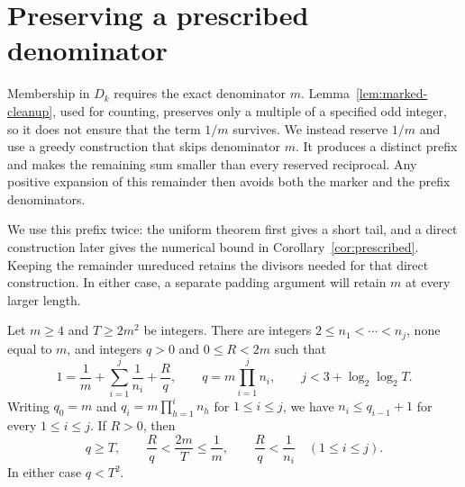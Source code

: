 \section{Preserving a prescribed denominator}\label{sec:prescribed}

Membership in $D_k$ requires the exact denominator $m$.
Lemma~\ref{lem:marked-cleanup}, used for counting, preserves only a
multiple of a specified odd integer, so it does not ensure that the
term $1/m$ survives. We instead reserve $1/m$ and use a greedy
construction that skips denominator $m$. It produces a distinct prefix
and makes the remaining sum smaller than every reserved reciprocal.
Any positive expansion of this remainder then avoids both the marker
and the prefix denominators.

We use this prefix twice: the uniform theorem first gives a short tail,
and a direct construction later gives the numerical bound in
Corollary~\ref{cor:prescribed}. Keeping the remainder unreduced retains
the divisors needed for that direct construction. In either case, a
separate padding argument will retain $m$ at every larger length.

\begin{lemma}
\label{lem:marked-greedy-prefix}
Let $m\ge4$ and $T\ge2m^2$ be integers.
There are integers $2\le n_1<\cdots<n_j$, none equal to $m$,
and integers $q>0$ and $0\le R<2m$ such that
\[
  1=\frac1m+\sum_{i=1}^{j}\frac1{n_i}+\frac Rq,
  \qquad q=m\prod_{i=1}^{j}n_i,
  \qquad
  j<3+\log_2\log_2 T.
\]
Writing $q_0=m$ and $q_i=m\prod_{h=1}^{i}n_h$ for $1\le i\le j$,
we have $n_i\le q_{i-1}+1$ for every $1\le i\le j$.
If $R>0$, then
\[
  q\ge T,\qquad
  \frac Rq<\frac{2m}{T}\le\frac1m,
  \qquad \frac Rq<\frac1{n_i}\quad(1\le i\le j).
\]
In either case $q<T^2$.
\end{lemma}


